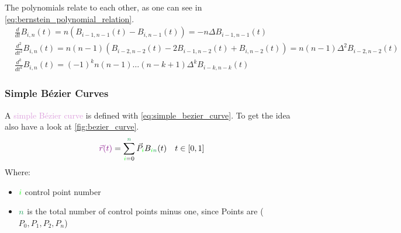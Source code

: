 The polynomials relate to each other, as one can see in \autoref{eq:bernstein_polynomial_relation}.
\begin{equation}\label{eq:bernstein_polynomial_relation}
\begin{aligned}
& \frac{d}{d t} B_{i, n}(t)=n\left(B_{i-1, n-1}(t)-B_{i, n-1}(t)\right)=-n \Delta B_{i-1, n-1}(t) \\
& \frac{d^{2}}{d t^{2}} B_{i, n}(t)=n(n-1)\left(B_{i-2, n-2}(t)-2 B_{i-1, n-2}(t)+B_{i, n-2}(t)\right)=n(n-1) \Delta^{2} B_{i-2, n-2}(t) \\
& \frac{d^{k}}{d t^{k}} B_{i, n}(t)=(-1)^{k} n(n-1) \ldots(n-k+1) \Delta^{k} B_{i-k, n-k}(t)
\end{aligned}
\end{equation}
\FloatBarrier
\subsubsection{Simple Bézier Curves}
A \textcolor{Plum}{simple Bézier curve} is defined with \autoref{eq:simple_bezier_curve}. To get the idea also have a look at \autoref{fig:bezier_curve}.
\begin{equation}\label{eq:simple_bezier_curve}
\textcolor{Plum}{\vec{r}(t)}=\sum_{\textcolor{green}{i}=0}^{\textcolor{ForestGreen}{n}} \vec{P}_{\textcolor{green}{i}} B_{\textcolor{green}{i} \textcolor{ForestGreen}{n}}(t) \quad t \in[0,1]
\end{equation}
Where:
\begin{itemize}
    \item $\textcolor{green}{i}$ control point number
    \item $\textcolor{ForestGreen}{n}$ is the total number of control points minus one, since Points are ($P_0, P_1, P_2, P_n$)
\end{itemize}
